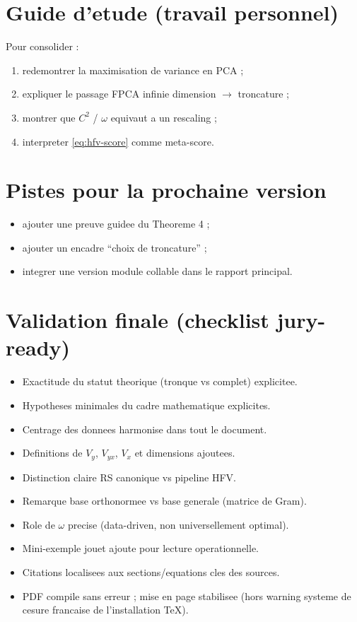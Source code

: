 \documentclass[11pt,a4paper]{article}
\begin{document}
\section{Guide d'etude (travail personnel)}

Pour consolider :
\begin{enumerate}[leftmargin=1.5em]
  \item redemontrer la maximisation de variance en PCA ;
  \item expliquer le passage FPCA infinie dimension $\rightarrow$ troncature ;
  \item montrer que $C^2$ / $\omega$ equivaut a un rescaling ;
  \item interpreter \eqref{eq:hfv-score} comme meta-score.
\end{enumerate}

\section{Pistes pour la prochaine version}
\begin{itemize}[leftmargin=1.5em]
  \item ajouter une preuve guidee du Theoreme 4 ;
  \item ajouter un encadre ``choix de troncature'' ;
  \item integrer une version module collable dans le rapport principal.
\end{itemize}

\section{Validation finale (checklist jury-ready)}
\begin{itemize}[leftmargin=1.5em]
  \item [OK] Exactitude du statut theorique (tronque vs complet) explicitee.
  \item [OK] Hypotheses minimales du cadre mathematique explicites.
  \item [OK] Centrage des donnees harmonise dans tout le document.
  \item [OK] Definitions de $V_y$, $V_{yx}$, $V_x$ et dimensions ajoutees.
  \item [OK] Distinction claire RS canonique vs pipeline HFV.
  \item [OK] Remarque base orthonormee vs base generale (matrice de Gram).
  \item [OK] Role de $\omega$ precise (data-driven, non universellement optimal).
  \item [OK] Mini-exemple jouet ajoute pour lecture operationnelle.
  \item [OK] Citations localisees aux sections/equations cles des sources.
  \item [OK] PDF compile sans erreur ; mise en page stabilisee (hors warning
  systeme de cesure francaise de l'installation TeX).
\end{itemize}
\end{document}
